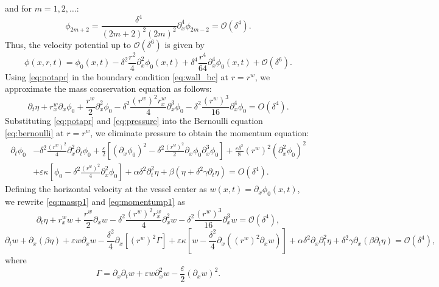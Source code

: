 \documentclass[alpha-refs, 12pt]{wiley-article}
\renewcommand{\O}{\mathcal{O}}
\newcommand{\eps}{\varepsilon}
\begin{document}
and for $m = 1, 2, \dots$:
\begin{equation}\label{eq:phim}
  \phi_{2m+2} = \frac{\delta^4}{(2m + 2)^2 (2m)^2} \partial_x^4 \phi_{2m-2} = \O(\delta^4).
\end{equation}
  Thus, the velocity potential up to $\O(\delta^6)$ is given by
\begin{equation}\label{eq:potapr}
  \phi(x, r, t) = \phi_0(x, t) - \delta^2 \frac{r^2}{4} \partial_x^2 \phi_0(x, t) + \delta^4 \frac{r^4}{64} \partial_x^4 \phi_0(x, t) + \O(\delta^6).
\end{equation}
Using \eqref{eq:potapr} in the boundary condition \eqref{eq:wall_bc} at $r = r^w$, we approximate the mass conservation equation as follows:
\begin{equation}\label{eq:massp1}
  \partial_t \eta + r^w_x \partial_x \phi_0 + \frac{r^w}{2} \partial_x^2 \phi_0 - \delta^2 \frac{(r^w)^2 r^w_x}{4} \partial_x^3 \phi_0 - \delta^2 \frac{(r^w)^3}{16} \partial_x^4 \phi_0 = O(\delta^4).
\end{equation}
Substituting \eqref{eq:potapr} and \eqref{eq:pressure} into the Bernoulli equation \eqref{eq:bernoulli} at $r = r^w$, we eliminate pressure to obtain the momentum equation:
\begin{equation}\label{eq:momentump1}
\begin{split}
\partial_t \phi_0 & - \delta^2 \frac{(r^w)^2}{4} \partial_x^2 \partial_t \phi_0 + \frac{\eps}{2} \left[ (\partial_x \phi_0)^2 - \delta^2 \frac{(r^w)^2}{2} \partial_x \phi_0 \partial_x^3 \phi_0 \right] + \frac{\eps \delta^2}{8} (r^w)^2 (\partial_x^2 \phi_0)^2 \\
& + \eps \kappa \left[ \phi_0 - \delta^2 \frac{(r^w)^2}{4} \partial_x^2 \phi_0 \right] + \alpha \delta^2 \partial_t^2 \eta + \beta (\eta + \delta^2 \gamma \partial_t \eta) = O(\delta^4).
\end{split}
\end{equation}
Defining the horizontal velocity at the vessel center as $w(x, t) = \partial_x \phi_0(x, t)$, we rewrite \eqref{eq:massp1} and \eqref{eq:momentump1} as
\begin{equation}\label{eq:massp2}
  \partial_t \eta + r^w_x w + \frac{r^w}{2} \partial_x w - \delta^2 \frac{(r^w)^2 r^w_x}{4} \partial_x^2 w - \delta^2 \frac{(r^w)^3}{16} \partial_x^3 w = \O(\delta^4),
\end{equation}
\begin{equation}\label{eq:momentump2}
  \partial_t w + \partial_x (\beta \eta) + \eps w \partial_x w - \frac{\delta^2}{4} \partial_x \left[ (r^w)^2 \Gamma \right] + \eps \kappa \left[ w - \frac{\delta^2}{4} \partial_x \left( (r^w)^2 \partial_x w \right) \right] + \alpha \delta^2 \partial_x \partial_t^2 \eta + \delta^2 \gamma \partial_x (\beta \partial_t \eta) = \O(\delta^4),
\end{equation}
where
\begin{equation}\label{eq:gamma}
  \Gamma = \partial_x \partial_t w + \eps w \partial_x^2 w - \frac{\eps}{2} (\partial_x w)^2.
\end{equation}
\end{document}
